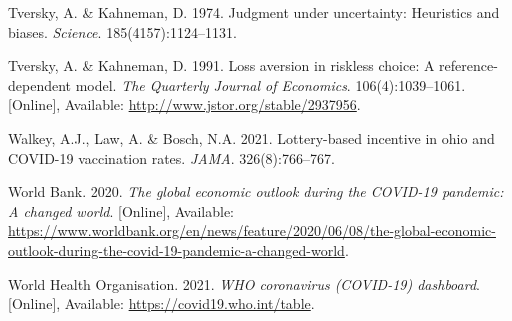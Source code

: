 \documentclass[11pt,preprint, authoryear]{elsarticle}
\numberwithin{equation}{section}
\numberwithin{figure}{section}
\numberwithin{table}{section}
\newlength{\cslhangindent}
\newenvironment{CSLReferences}%
  {\setlength{\parindent}{0pt}%
  \everypar{\setlength{\hangindent}{\cslhangindent}}\ignorespaces}%
  {\par}
\begin{document}
\begin{CSLReferences}{1}{0}
\leavevmode\hypertarget{ref-khan}{}%
Tversky, A. \& Kahneman, D. 1974. Judgment under uncertainty: Heuristics
and biases. \emph{Science}. 185(4157):1124--1131.

\leavevmode\hypertarget{ref-ref}{}%
Tversky, A. \& Kahneman, D. 1991. Loss aversion in riskless choice: A
reference-dependent model. \emph{The Quarterly Journal of Economics}.
106(4):1039--1061. {[}Online{]}, Available:
\url{http://www.jstor.org/stable/2937956}.

\leavevmode\hypertarget{ref-ohio}{}%
Walkey, A.J., Law, A. \& Bosch, N.A. 2021. Lottery-based incentive in
ohio and COVID-19 vaccination rates. \emph{JAMA}. 326(8):766--767.

\leavevmode\hypertarget{ref-bank}{}%
World Bank. 2020. \emph{The global economic outlook during the COVID-19
pandemic: A changed world}. {[}Online{]}, Available:
\url{https://www.worldbank.org/en/news/feature/2020/06/08/the-global-economic-outlook-during-the-covid-19-pandemic-a-changed-world}.

\leavevmode\hypertarget{ref-who}{}%
World Health Organisation. 2021. \emph{WHO coronavirus (COVID-19)
dashboard}. {[}Online{]}, Available:
\url{https://covid19.who.int/table}.

\end{CSLReferences}


\end{document}

